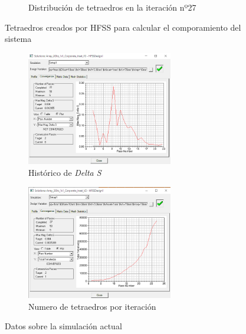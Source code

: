 \begin{figure}[H]
\begin{subfigure}[b]{0.4\textwidth}
         \caption{Distribución de tetraedros en la iteración nº27}
         \label{fig:tetrab}
     \end{subfigure}
        \caption{Tetraedros creados por HFSS para calcular el comporamiento del sistema}
        \label{fig:tetra}
\end{figure}

\begin{figure}[H]
     \centering
     \begin{subfigure}[b]{\textwidth}
         \centering
         \includegraphics[width=0.7\textwidth]{archivos/desarrollo/11a}
         \caption{Histórico de \textit{Delta S}}
         \label{fig:convera}
     \end{subfigure}

     \begin{subfigure}[b]{\textwidth}
         \centering
         \includegraphics[width=0.7\textwidth]{archivos/desarrollo/11b}
         \caption{Numero de tetraedros por iteración}
         \label{fig:converb}
     \end{subfigure}

        \caption{Datos sobre la simulación actual}
        \label{fig:conver}
\end{figure}

